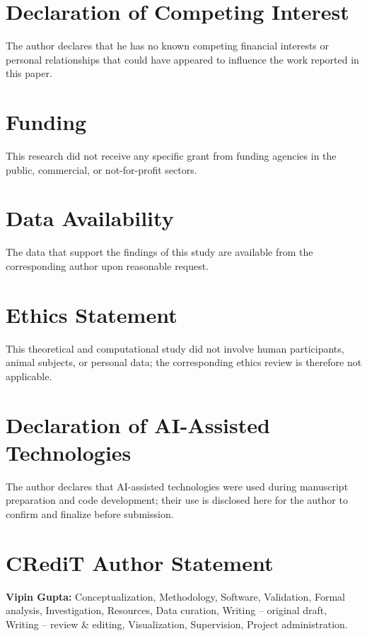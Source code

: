 \documentclass[preprint,12pt]{elsarticle}
\begin{document}
\section*{Declaration of Competing Interest}
The author declares that he has no known competing financial interests or personal relationships that could have appeared to influence the work reported in this paper.

\section*{Funding}
This research did not receive any specific grant from funding agencies in the public, commercial, or not-for-profit sectors.

\section*{Data Availability}
The data that support the findings of this study are available from the corresponding author upon reasonable request.

\section*{Ethics Statement}
This theoretical and computational study did not involve human participants, animal subjects, or personal data; the corresponding ethics review is therefore not applicable.

\section*{Declaration of AI-Assisted Technologies}
The author declares that AI-assisted technologies were used during manuscript preparation and code development; their use is disclosed here for the author to confirm and finalize before submission.

\section*{CRediT Author Statement}
\textbf{Vipin Gupta:} Conceptualization, Methodology, Software, Validation, Formal analysis, Investigation, Resources, Data curation, Writing -- original draft, Writing -- review \& editing, Visualization, Supervision, Project administration.



\end{document}

